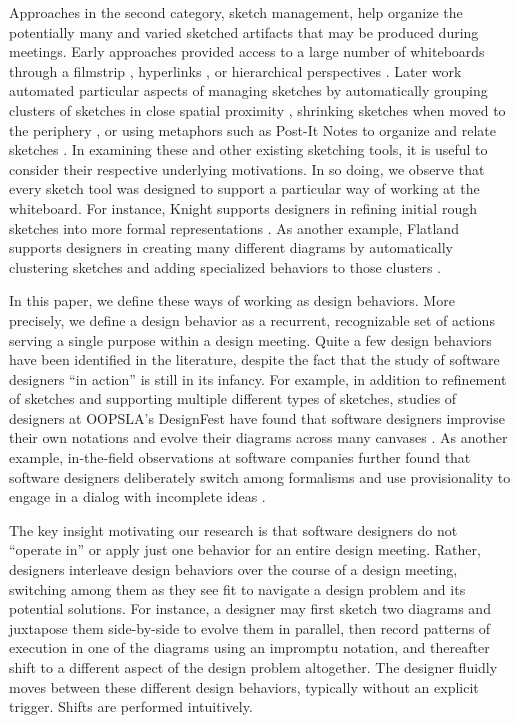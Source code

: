 Approaches in the second category, sketch management, help organize the potentially many and varied sketched artifacts that may be produced during meetings. Early approaches provided access to a large number of whiteboards through a filmstrip \cite{stefik1987beyond}, hyperlinks \cite{Streitz:1994:DIM:192844.193044}, or hierarchical perspectives \cite{newman2003denim}. Later work automated particular aspects of managing sketches by automatically grouping clusters of sketches in close spatial proximity \cite{mynatt1999flatland}, shrinking sketches when moved to the periphery \cite{guimbretiere2001fluid}, or using metaphors such as Post-It Notes to organize and relate sketches \cite{klemmer2001designers}.  
In examining these and other existing sketching tools, it is useful to consider their respective underlying motivations. In so doing, we observe that every sketch tool was designed to support a particular way of working at the whiteboard. For instance, Knight supports designers in refining initial rough sketches into more formal representations \cite{damm2000supporting}. As another example, Flatland supports designers in creating many different diagrams by automatically clustering sketches and adding specialized behaviors to those clusters \cite{mynatt1999flatland}.

In this paper, we define these ways of working as design behaviors. More precisely, we define a design behavior as a recurrent, recognizable set of actions serving a single purpose within a design meeting. Quite a few design behaviors have been identified in the literature, despite the fact that the study of software designers ``in action'' is still in its infancy. For example, in addition to refinement of sketches and supporting multiple different types of sketches, studies of designers at OOPSLA’s DesignFest have found that software designers improvise their own notations and evolve their diagrams across many canvases \cite{dekel2007notation}. As another example, in-the-field observations at software companies further found that software designers deliberately switch among formalisms and use provisionality to engage in a dialog with incomplete ideas \cite{petre2009insights}. 

The key insight motivating our research is that software designers do not ``operate in'' or apply just one behavior for an entire design meeting. Rather, designers interleave design behaviors over the course of a design meeting, switching among them as they see fit to navigate a design problem and its potential solutions. For instance, a designer may first sketch two diagrams and juxtapose them side-by-side to evolve them in parallel, then record patterns of execution in one of the diagrams using an impromptu notation, and thereafter shift to a different aspect of the design problem altogether. The designer fluidly moves between these different design behaviors, typically without an explicit trigger. Shifts are performed intuitively.

